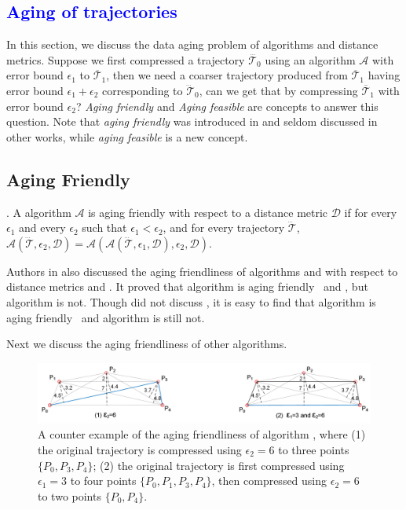 
\textcolor{blue}{\section{Aging of trajectories}}

In this section, we discuss the data aging problem of \lsa algorithms and distance metrics.
%
Suppose we first compressed a trajectory $\dddot{\mathcal{T}_0}$ using an \lsa algorithm $\mathcal{A}$ with error bound $\epsilon_1$ to $\overline{\mathcal{T}}_1$, then we need a coarser trajectory produced from $\overline{\mathcal{T}}_1$  having error bound $\epsilon_1 + \epsilon_2$ corresponding to $\dddot{\mathcal{T}}_0$, can we get that by compressing $\overline{\mathcal{T}}_1$ with error bound $\epsilon_2$?  \emph{Aging friendly \cite{Cao:Spatio}} and \emph{Aging feasible} are concepts to answer this question. Note that \emph{aging friendly} was introduced in \cite{Cao:Spatio} and seldom discussed in other works, while \emph{aging feasible} is a new concept.


\subsection{Aging Friendly}
	
	
. {A \lsa algorithm $\mathcal{A}$ is aging friendly with respect to a distance metric $\mathcal{D}$ if for every $\epsilon_1$ and every $\epsilon_2$ such that $\epsilon_1 < \epsilon_2$, and for every trajectory $\dddot{\mathcal{T}}$, $\mathcal{A}(\dddot{\mathcal{T}}, \epsilon_2, \mathcal{D})= \mathcal{A}(\mathcal{A}(\dddot{\mathcal{T}}, \epsilon_1, \mathcal{D}), \epsilon_2, \mathcal{D})$.}

	
Authors in \cite{Cao:Spatio} also discussed the aging friendliness of algorithms \opt and \dpa with respect to distance metrics \ped and \sed. It proved that algorithm \dpa is aging friendly \wrt~\ped and \sed, but algorithm \opt is not. 
Though \cite{Cao:Spatio} did not discuss \dad, it is easy to find that algorithm \dpa is aging friendly \wrt~\dad and algorithm \opt is still not. 




Next we discuss the aging friendliness of other algorithms.


\begin{figure}[tb!]
	\centering
	\includegraphics[scale=0.66]{Figures/Fig-aging-pavlidis.png}

	\caption{\small A counter example of the aging friendliness of algorithm \tpa, where (1) the original trajectory is compressed using $\epsilon_2=6$ to three points $\{P_0, P_3, P_4\}$; (2) the original trajectory is first compressed using $\epsilon_1=3$ to four points $\{P_0, P_1, P_3, P_4\}$, then compressed using $\epsilon_2=6$ to two points $\{P_0, P_4\}$. }
	\vspace{-1ex}
	\label{fig:aging-pavlidis}
\end{figure}


